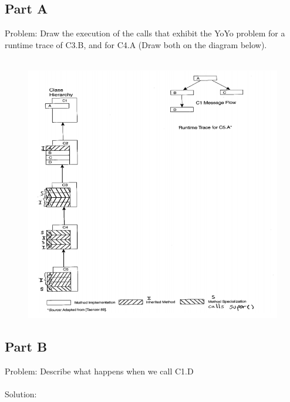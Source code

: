 \documentclass{article}
\begin{document}
\subsection*{Part A}
Problem: Draw the execution of the calls that exhibit the YoYo problem for a runtime trace of
C3.B, and for C4.A (Draw both on the diagram below). \\\\
\begin{figure}[h]
	\centering
	\includegraphics[width=6in]{yo-yo-diagram.png}
\end{figure}
\subsection*{Part B}
Problem: Describe what happens when we call C1.D \\\\
Solution:  

\newpage
\end{document}
